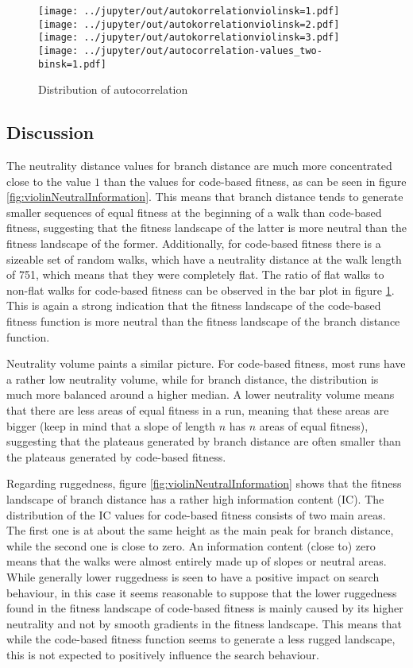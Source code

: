 \begin{figure}[h]
	\texttt{[image: ../jupyter/out/autokorrelationviolinsk=1.pdf]}
	\texttt{[image: ../jupyter/out/autokorrelationviolinsk=2.pdf]}
	\texttt{[image: ../jupyter/out/autokorrelationviolinsk=3.pdf]}
	\texttt{[image: ../jupyter/out/autocorrelation-values\_two-binsk=1.pdf]}
	\caption{Distribution of autocorrelation}\label{fig:violinAutocorr}
\end{figure}

\subsection{Discussion}

The neutrality distance values for branch distance are much more concentrated close to the value $1$ than the values for code-based fitness, as can be seen in figure \ref{fig:violinNeutralInformation}.
This means that branch distance tends to generate smaller sequences of equal fitness at the beginning of a walk than code-based fitness, suggesting that the fitness landscape of the latter is more neutral than the fitness landscape of the former. 
Additionally, for code-based fitness there is a sizeable set of random walks, which have a neutrality distance at the walk length of 751, which means that they were completely flat.
The ratio of flat walks to non-flat walks for code-based fitness can be observed in the bar plot in figure \ref{fig:violinAutocorr}.
This is again a strong indication that the fitness landscape of the code-based fitness function is more neutral than the fitness landscape of the branch distance function.

Neutrality volume paints a similar picture. For code-based fitness, most runs have a rather low neutrality volume, while for branch distance, the distribution is much more balanced around a higher median.
A lower neutrality volume means that there are less areas of equal fitness in a run, meaning that these areas are bigger (keep in mind that a slope of length $n$ has $n$ areas of equal fitness), suggesting that the plateaus generated by branch distance are often smaller than the plateaus generated by code-based fitness.

Regarding ruggedness, figure \ref{fig:violinNeutralInformation} shows that the fitness landscape of branch distance has a rather high information content (IC).
The distribution of the IC values for code-based fitness consists of two main areas.
The first one is at about the same height as the main peak for branch distance, while the second one is close to zero.
An information content (close to) zero means that the walks were almost entirely made up of slopes or neutral areas. While generally lower ruggedness is seen to have a positive impact on search behaviour, in this case it seems reasonable to suppose that the lower ruggedness found in the fitness landscape of code-based fitness is mainly caused by its higher neutrality and not by smooth gradients in the fitness landscape.
This means that while the code-based fitness function seems to generate a less rugged landscape, this is not expected to positively influence the search behaviour.

